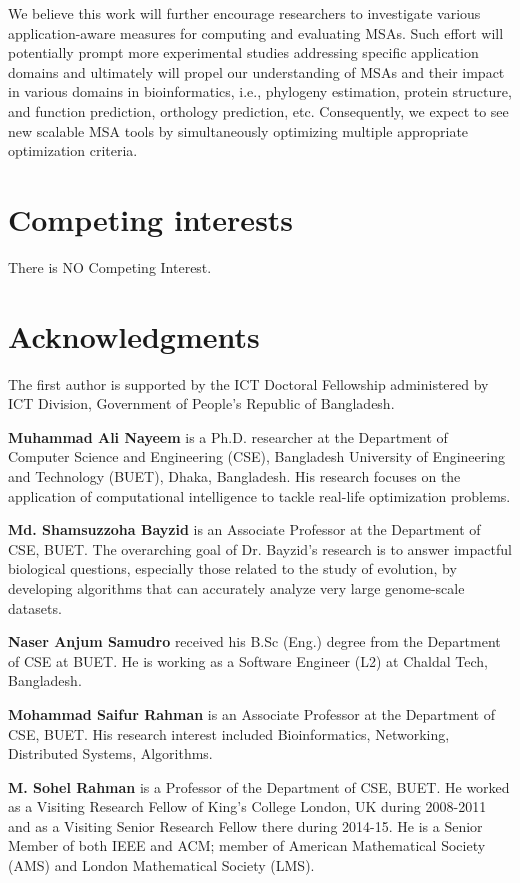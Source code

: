\documentclass[a4paper,fleqn, review]{cas-dc}
\begin{document}
We believe this work will further encourage researchers to investigate various application-aware measures for computing and evaluating MSAs. Such effort will potentially prompt more experimental studies addressing specific application domains and ultimately will propel our understanding of MSAs and their impact in various domains in bioinformatics, i.e., phylogeny estimation, protein structure, and function prediction, orthology prediction, etc. Consequently, we expect to see new scalable MSA tools by simultaneously optimizing multiple appropriate optimization criteria.
 
\section*{Competing interests}
There is NO Competing Interest.


\section*{Acknowledgments}
The first author is supported by the ICT Doctoral Fellowship administered by ICT Division, Government of People’s Republic of Bangladesh.






\vskip12pt

\bio{}
\textbf{Muhammad Ali Nayeem} is a Ph.D. researcher at the Department of Computer Science and Engineering (CSE), Bangladesh University of Engineering and Technology (BUET), Dhaka, Bangladesh. His research focuses on the application of computational intelligence to tackle real-life optimization problems.
\endbio

\bio{}
\textbf{Md. Shamsuzzoha Bayzid} is an Associate Professor at the Department of CSE, BUET. The overarching goal of Dr. Bayzid’s research is to answer impactful biological questions, especially those related to the study of evolution, by developing algorithms that can accurately analyze very large genome-scale datasets.
\endbio

\bio{}
\textbf{Naser Anjum Samudro} received his B.Sc (Eng.) degree from the Department of CSE at BUET. He is working as a Software Engineer (L2) at Chaldal Tech, Bangladesh.
\endbio

\bio{}
\textbf{Mohammad Saifur Rahman} is an Associate Professor at the Department of CSE, BUET. His research interest included Bioinformatics, Networking, Distributed Systems, Algorithms.
\endbio

\bio{}
\textbf{M. Sohel Rahman} is a Professor of the Department of CSE, BUET. He worked as a Visiting Research Fellow of King’s College London, UK during 2008-2011 and as a Visiting Senior Research Fellow there during 2014-15. He is a Senior Member of both IEEE and ACM; member of American Mathematical Society (AMS) and London Mathematical Society (LMS). 
\endbio
\end{document}
